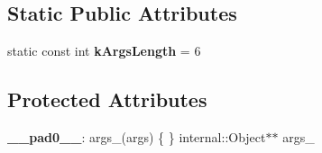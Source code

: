 \subsection*{Static Public Attributes}
\begin{DoxyCompactItemize}
\item 
\hypertarget{classv8_1_1_property_callback_info_a9fc9663a2e23f9324fe61f92d1e7e5b5}{}static const int {\bfseries k\+Args\+Length} = 6\label{classv8_1_1_property_callback_info_a9fc9663a2e23f9324fe61f92d1e7e5b5}

\end{DoxyCompactItemize}
\subsection*{Protected Attributes}
\begin{DoxyCompactItemize}
\item 
\hypertarget{classv8_1_1_property_callback_info_a53b0655915e39577eea233f287c90fde}{}{\bfseries \+\_\+\+\_\+pad0\+\_\+\+\_\+}\+: args\+\_\+(args) \{ \} internal\+::\+Object$\ast$$\ast$ args\+\_\+\label{classv8_1_1_property_callback_info_a53b0655915e39577eea233f287c90fde}

\end{DoxyCompactItemize}
